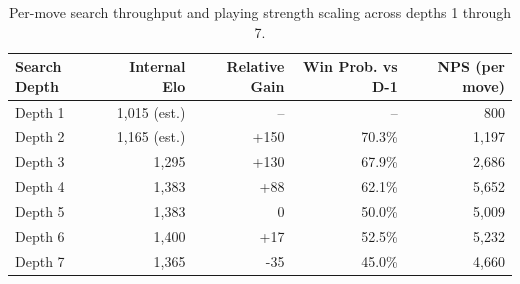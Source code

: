 \begin{table}[htbp]
\centering
\caption[Cross-Depth Elo Scaling and Performance Metrics]{Per-move search throughput and playing strength scaling across depths 1 through 7.}
\label{tab:cross_depth_elo}
\begin{tabularx}{\textwidth}{Xrrrr}
\toprule
\textbf{Search Depth} & \textbf{Internal Elo} & \textbf{Relative Gain} & \textbf{Win Prob. vs D-1} & \textbf{NPS (per move)} \\
\midrule
Depth 1  & 1,015 (est.) & --         & --         & 800 \\
Depth 2  & 1,165 (est.) & +150       & 70.3\%     & 1,197 \\
Depth 3  & 1,295       & +130       & 67.9\%     & 2,686 \\
Depth 4  & 1,383       & +88        & 62.1\%     & 5,652 \\
Depth 5  & 1,383       & 0          & 50.0\%     & 5,009 \\
Depth 6  & 1,400       & +17        & 52.5\%     & 5,232 \\
Depth 7  & 1,365       & -35        & 45.0\%     & 4,660 \\
\bottomrule
\end{tabularx}
\end{table}
